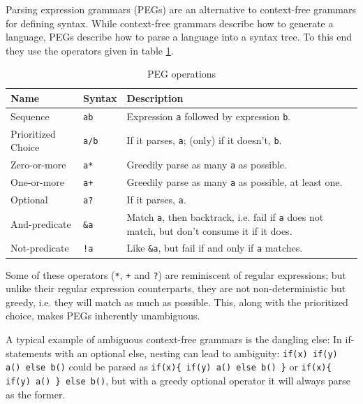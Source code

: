 			Parsing expression grammars (PEGs) are an alternative to context-free grammars for defining syntax\cite{peg}. While context-free grammars describe how to generate a language, PEGs describe how to parse a language into a syntax tree. To this end they use the operators given in table \ref{tab:peg_ops}.
			
			\begin{table}
			\begin{center}
			\begin{tabular}{ l l p{10cm} }
			\toprule
			Name               & Syntax          & Description \\
			\midrule
			Sequence           & \lstinline$ab$  & Expression \lstinline$a$ followed by expression \lstinline$b$. \\
			Prioritized Choice & \lstinline$a/b$ & If it parses, \lstinline$a$; (only) if it doesn't, \lstinline$b$. \\
			Zero-or-more       & \lstinline$a*$  & Greedily parse as many \lstinline$a$ as possible. \\
			One-or-more        & \lstinline$a+$  & Greedily parse as many \lstinline$a$ as possible, at least one. \\
			Optional           & \lstinline$a?$  & If it parses, \lstinline$a$. \\
			And-predicate      & \lstinline$&a$  & Match \lstinline$a$, then backtrack, i.e. fail if \lstinline$a$ does not match, but don't consume it if it does. \\
			Not-predicate      & \lstinline$!a$  & Like \lstinline$&a$, but fail if and only if \lstinline$a$ matches. \\
			\bottomrule
			\end{tabular}
			\caption{PEG operations}\label{tab:peg_ops}
			\end{center}
			\end{table}
			
			Some of these operators (\lstinline$*$, \lstinline$+$ and \lstinline$?$) are reminiscent of regular expressions; but unlike their regular expression counterparts, they are not non-deterministic but greedy, i.e. they will match as much as possible. This, along with the prioritized choice, makes PEGs inherently unambiguous.
			
			A typical example of ambiguous context-free grammars is the dangling else: In if-statements with an optional else, nesting can lead to ambiguity: \lstinline$if(x) if(y) a() else b()$ could be parsed as \lstinline$if(x){ if(y) a() else b() }$ or \lstinline$if(x){ if(y) a() } else b()$, but with a greedy optional operator it will always parse as the former.
			
